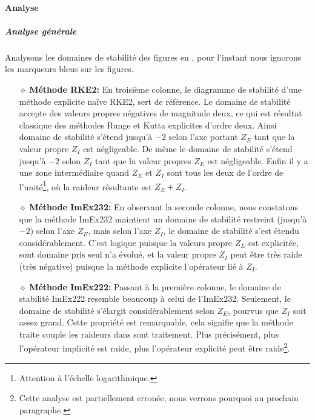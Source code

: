         \paragraph{Analyse}
            \subparagraph{Analyse générale}\label{par:analyse_generale_stab_nagumo}
                Analysons les domaines de stabilité des figures en , pour l'instant nous ignorons les marqueurs bleus sur les figures.
                \begin{itemize}
                    \item[$\diamond$]\textbf{Méthode RKE2:} En troisième colonne, le diagramme de stabilité d'une méthode explicite naïve RKE2, sert de référence. 
                        Le domaine de stabilité accepte des valeurs propres négatives de magnitude deux, ce qui est résultat classique des méthodes Runge et Kutta explicites d'ordre deux.
                        Ainsi domaine de stabilité s'étend jusqu'à $-2$ selon l'axe portant $Z_E$ tant que la valeur propre $Z_I$ est négligeable.
                        De même le domaine de stabilité s'étend jusqu'à $-2$ selon $Z_I$ tant que la valeur propres $Z_E$ est négligeable. 
                        Enfin il y a une zone intermédiaire quand $Z_E$ et $Z_I$ sont tous les deux de l'ordre de l'unité\footnote{Attention à l'échelle logarithmique.},
                        où la raideur résultante est $Z_E+Z_I$.

                    \item[$\diamond$]\textbf{Méthode ImEx232:} En observant la seconde colonne, nous constatons que la méthode ImEx232 maintient un domaine de stabilité restreint (jusqu'à $-2$) selon l'axe $Z_E$,
                        mais selon l'axe $Z_I$, le domaine de stabilité s'est étendu considérablement. C'est logique puisque la valeurs propre $Z_E$ est explicitée,
                        sont domaine pris seul n'a évolué, et la valeur propre $Z_I$ peut être très raide (très négative) puisque la méthode explicite l'opérateur lié à $Z_I$.

                    \item[$\diamond$]\textbf{Méthode ImEx222:} Passant à la première colonne, le domaine de stabilité ImEx222 resemble beaucoup à celui de l'ImEx232. Seulement, le domaine de stabilité s'élargit considérablement
                        selon $Z_E$, pourvus que $Z_I$ soit assez grand. Cette propriété est remarquable, cela signifie que la méthode traite couple les raideurs dans sont traitement. 
                        Plus précisément, plus l'opérateur implicité est raide, plus l'opérateur explicité peut être raide\footnote{Cette analyse est partiellement erronée, nous verrons 
                        pourquoi au prochain paragraphe.}.
                \end{itemize}

